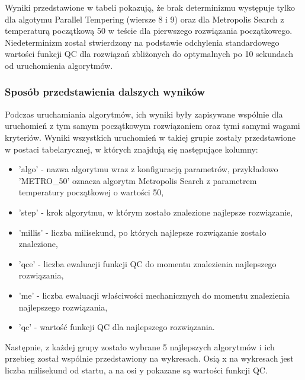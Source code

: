 Wyniki przedstawione w tabeli pokazują, że brak determinizmu występuje tylko dla algotymu Parallel Tempering (wiersze 8 i 9) oraz dla Metropolis Search z temperaturą początkową 50 w teście dla pierwszego rozwiązania początkowego. Niedeterminizm został stwierdzony na podstawie odchylenia standardowego wartości funkcji QC dla rozwiązań zbliżonych do optymalnych po 10 sekundach od uruchomienia algorytmów.

\subsubsection{Sposób przedstawienia dalszych wyników}
Podczas uruchamiania algorytmów, ich wyniki były zapisywane wspólnie dla uruchomień z tym samym początkowym rozwiązaniem oraz tymi samymi wagami kryteriów. Wyniki wszystkich uruchomień w takiej grupie zostały przedstawione w postaci tabelarycznej, w których znajdują się następujące kolumny:
\begin{itemize}
    \item 'algo' - nazwa algorytmu wraz z konfiguracją parametrów, przykładowo 'METRO\_50' oznacza algorytm Metropolis Search z parametrem temperatury początkowej o wartości 50,
    \item 'step' - krok algorytmu, w którym zostało znalezione najlepsze rozwiązanie,
    \item 'millis' - liczba milisekund, po których najlepsze rozwiązanie zostało znalezione,
    \item 'qce' - liczba ewaluacji funkcji QC do momentu znalezienia najlepszego rozwiązania,
    \item 'me' - liczba ewaluacji właściwości mechanicznych do momentu znalezienia najlepszego rozwiązania,
    \item 'qc' - wartość funkcji QC dla najlepszego rozwiązania.
\end{itemize}

Następnie, z każdej grupy zostało wybrane 5 najlepszych algorytmów i ich przebieg został wspólnie przedstawiony na wykresach. Osią x na wykresach jest liczba milisekund od startu, a na osi y pokazane są wartości funkcji QC.
\FloatBarrier
